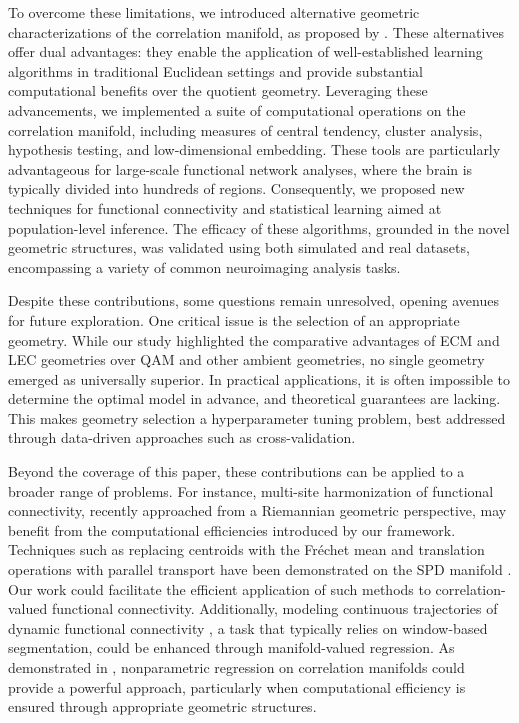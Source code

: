 \documentclass[10pt]{article}
\newcommand{\Frechet}{Fr\'{e}chet }
\begin{document}
To overcome these limitations, we introduced alternative geometric characterizations of the correlation manifold, as proposed by \cite{thanwerdas_2022_TheoreticallyComputationallyConvenient}. These alternatives offer dual advantages: they enable the application of well-established learning algorithms in traditional Euclidean settings and provide substantial computational benefits over the quotient geometry. Leveraging these advancements, we implemented a suite of computational operations on the correlation manifold, including measures of central tendency, cluster analysis, hypothesis testing, and low-dimensional embedding. These tools are particularly advantageous for large-scale functional network analyses, where the brain is typically divided into hundreds of regions. Consequently, we proposed new techniques for functional connectivity and statistical learning aimed at population-level inference. The efficacy of these algorithms, grounded in the novel geometric structures, was validated using both simulated and real datasets, encompassing a variety of common neuroimaging analysis tasks.

Despite these contributions, some questions remain unresolved, opening avenues for future exploration. One critical issue is the selection of an appropriate geometry. While our study highlighted the comparative advantages of ECM and LEC geometries over QAM and other ambient geometries, no single geometry emerged as universally superior. In practical applications, it is often impossible to determine the optimal model in advance, and theoretical guarantees are lacking. This makes geometry selection a hyperparameter tuning problem, best addressed through data-driven approaches such as cross-validation.

Beyond the coverage of this paper, these contributions can be applied to a broader range of problems. For instance, multi-site harmonization of functional connectivity, recently approached from a Riemannian geometric perspective, may benefit from the computational efficiencies introduced by our framework. Techniques such as replacing centroids with the \Frechet mean and translation operations with parallel transport have been demonstrated on the SPD manifold \citep{simeon_2022_RiemannianGeometryFunctional, honnorat_2024_RiemannianFrameworksHarmonization}. Our work could facilitate the efficient application of such methods to correlation-valued functional connectivity. Additionally, modeling continuous trajectories of dynamic functional connectivity \citep{preti_2017_DynamicFunctionalConnectome}, a task that typically relies on window-based segmentation, could be enhanced through manifold-valued regression. As demonstrated in \cite{you_2021_RevisitingRiemannianGeometry}, nonparametric regression on correlation manifolds could provide a powerful approach, particularly when computational efficiency is ensured through appropriate geometric structures.
\end{document}
